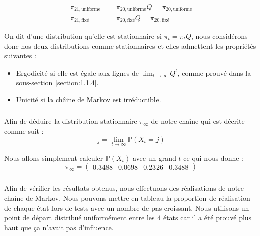 \begin{align*}
  \pi_{21,\text{uniforme}} &= \pi_{20,\text{uniforme}} Q = \pi_{20,\text{uniforme}}\\
  \pi_{21,\text{fixé}} &= \pi_{20,\text{fixé}} Q = \pi_{20,\text{fixé}} 
\end{align*}

On dit d'une distribution qu'elle est stationnaire si $\pi_t = \pi_t Q$, nous considérons donc nos deux distributions comme stationnaires et elles admettent les propriétés suivantes :\\
\begin{itemize}
  \item Ergodicité si elle est égale aux lignes de $\lim_{t \rightarrow \infty} Q^t$, comme prouvé dans la sous-section \ref{section:1.1.4}.
  \item Unicité si la châine de Markov est irréductible.
\end{itemize}

\subsubsection{}

Afin de déduire la distribution stationnaire $\pi_{\infty}$ de notre chaîne qui est décrite comme suit :
\begin{equation*}
  [\pi_\infty]_j = \lim_{t \rightarrow \infty} \mathbb{P}(X_t = j)
\end{equation*}

Nous allons simplement calculer $\mathbb{P}(X_t)$ avec un grand $t$ ce qui nous donne :
\begin{equation*}
  \pi_{\infty} = 
  \begin{pmatrix}
    0.3488 & 0.0698 & 0.2326 & 0.3488
  \end{pmatrix}
\end{equation*}
\subsubsection{}
Afin de vérifier les résultats obtenus, nous effectuons des réalisations de notre chaîne de Markov. Nous pouvons mettre en tableau la proportion de réalisation 
de chaque état lors de tests avec un nombre de pas croissant. Nous utilisons un point de départ distribué uniformément entre les 4 états car il a été prouvé
plus haut que ça n'avait pas d'influence.

